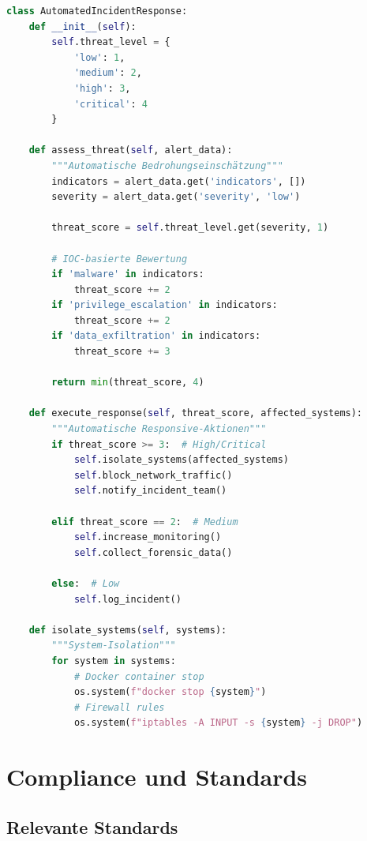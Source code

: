 \documentclass[11pt,a4paper]{article}
\begin{document}
\begin{lstlisting}[language=python, caption=Automatisierte Incident Response]
class AutomatedIncidentResponse:
    def __init__(self):
        self.threat_level = {
            'low': 1,
            'medium': 2, 
            'high': 3,
            'critical': 4
        }
        
    def assess_threat(self, alert_data):
        """Automatische Bedrohungseinschätzung"""
        indicators = alert_data.get('indicators', [])
        severity = alert_data.get('severity', 'low')
        
        threat_score = self.threat_level.get(severity, 1)
        
        # IOC-basierte Bewertung
        if 'malware' in indicators:
            threat_score += 2
        if 'privilege_escalation' in indicators:
            threat_score += 2
        if 'data_exfiltration' in indicators:
            threat_score += 3
            
        return min(threat_score, 4)
        
    def execute_response(self, threat_score, affected_systems):
        """Automatische Responsive-Aktionen"""
        if threat_score >= 3:  # High/Critical
            self.isolate_systems(affected_systems)
            self.block_network_traffic()
            self.notify_incident_team()
            
        elif threat_score == 2:  # Medium
            self.increase_monitoring()
            self.collect_forensic_data()
            
        else:  # Low
            self.log_incident()
            
    def isolate_systems(self, systems):
        """System-Isolation"""
        for system in systems:
            # Docker container stop
            os.system(f"docker stop {system}")
            # Firewall rules
            os.system(f"iptables -A INPUT -s {system} -j DROP")
\end{lstlisting}

\section{Compliance und Standards}

\subsection{Relevante Standards}
\end{document}
